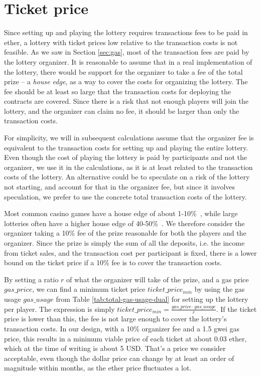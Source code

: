 \section{Ticket price}
\label{sec:ticket-price}

Since setting up and playing the lottery requires transactions fees to be paid in ether, a lottery with ticket prices low relative to the transaction costs is not feasible. As we saw in Section \ref{sec:gas}, most of the transaction fees are paid by the lottery organizer. It is reasonable to assume that in a real implementation of the lottery, there would be support for the organizer to take a fee of the total prize – a \emph{house edge}, as a way to cover the costs for organizing the lottery. The fee should be at least so large that the transaction costs for deploying the contracts are covered. Since there is a risk that not enough players will join the lottery, and the organizer can claim no fee, it should be larger than only the transaction costs. 

For simplicity, we will in subsequent calculations assume that the organizer fee is equivalent to the transaction costs for setting up and playing the entire lottery. Even though the cost of playing the lottery is paid by participants and not the organizer, we use it in the calculations, as it is at least related to the transaction costs of the lottery. An alternative could be to speculate on a risk of the lottery not starting, and account for that in the organizer fee, but since it involves speculation, we prefer to use the concrete total transaction costs of the lottery.

Most common casino games have a house edge of about 1-10\%~\cite{walsh_houses_nodate}, while large lotteries often have a higher house edge of 40-50\%~\cite{shackleford_house_nodate}. We therefore consider the organizer taking a 10\% fee of the prize reasonable for both the players and the organizer. Since the prize is simply the sum of all the deposits, i.e. the income from ticket sales, and the transaction cost per participant is fixed, there is a lower bound on the ticket price if a 10\% fee is to cover the transaction costs.

By setting a ratio $r$ of what the organizer will take of the prize, and a gas price $gas\_price$, we can find a minimum ticket price $ticket\_price_{min}$ by using the gas usage $gas\_usage$ from Table \ref{tab:total-gas-usage-dual} for setting up the lottery per player. The expression is simply $ticket\_price_{min}=\frac{gas\_price \cdot gas\_usage}{r}$. If the ticket price is lower than this, the fee is not large enough to cover the lottery's transaction costs.
In our design, with a 10\% organizer fee and a 1.5 gwei gas price, this results in a minimum viable price of each ticket at about 0.03 ether, which at the time of writing is about 5 USD. That's a price we consider acceptable, even though the dollar price can change by at least an order of magnitude within months, as the ether price fluctuates a lot.

